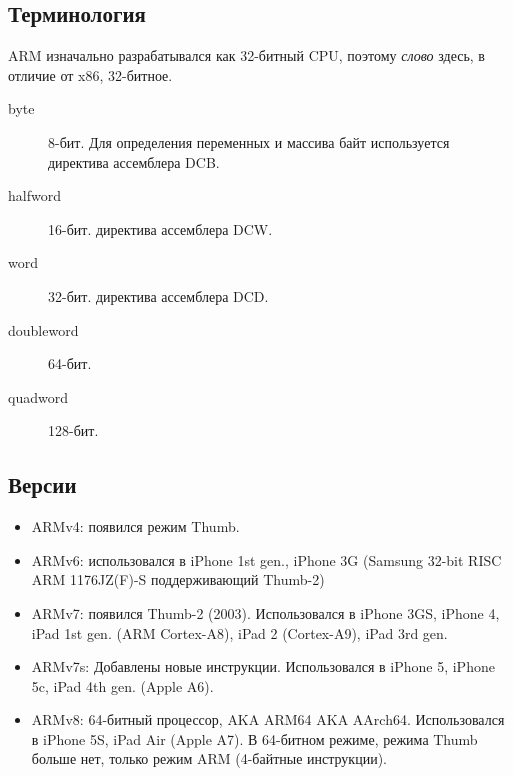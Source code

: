 
\subsection{Терминология}

ARM изначально разрабатывался как 32-битный \ac{CPU}, 
поэтому \emph{слово} здесь, в отличие от x86, 32-битное.

\begin{description}
	\item[byte] 8-бит.
		Для определения переменных и массива байт используется директива ассемблера DCB.
	\item[halfword] 16-бит. \dittoclosing директива ассемблера DCW.
	\item[word] 32-бит. \dittoclosing директива ассемблера DCD.
	\item[doubleword] 64-бит.
	\item[quadword] 128-бит.
\end{description}

\subsection{Версии}

\begin{itemize}
\item ARMv4: появился режим Thumb.

\item ARMv6: использовался в iPhone 1st gen., iPhone 3G 
(Samsung 32-bit RISC ARM 1176JZ(F)-S поддерживающий Thumb-2)

\item ARMv7: появился Thumb-2 (2003).
Использовался в iPhone 3GS, iPhone 4, iPad 1st gen. (ARM Cortex-A8), iPad 2 (Cortex-A9),
iPad 3rd gen.

\item ARMv7s: Добавлены новые инструкции.
Использовался в iPhone 5, iPhone 5c, iPad 4th gen. (Apple A6).

\item ARMv8: 64-битный процессор, \ac{AKA} ARM64 \ac{AKA} AArch64.
Использовался в iPhone 5S, iPad Air (Apple A7).
В 64-битном режиме, режима Thumb больше нет, только режим ARM (4-байтные инструкции).
\end{itemize}



